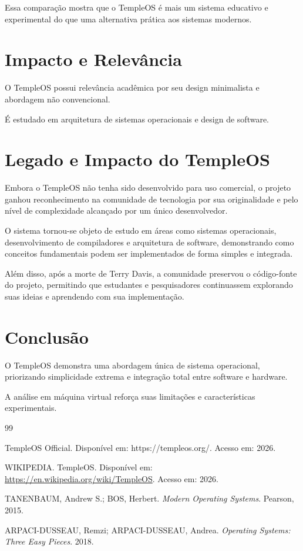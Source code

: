 \documentclass[12pt,oneside,a4paper,chapter=TITLE]{abntex2}
\begin{document}
Essa comparação mostra que o TempleOS é mais um sistema educativo e experimental do que uma alternativa prática aos sistemas modernos.

\section{Impacto e Relevância}

O TempleOS possui relevância acadêmica por seu design minimalista e abordagem não convencional.

É estudado em arquitetura de sistemas operacionais e design de software.

\section {Legado e Impacto do TempleOS}

Embora o TempleOS não tenha sido desenvolvido para uso comercial, o projeto ganhou reconhecimento na comunidade de tecnologia por sua originalidade e pelo nível de complexidade alcançado por um único desenvolvedor.

O sistema tornou-se objeto de estudo em áreas como sistemas operacionais, desenvolvimento de compiladores e arquitetura de software, demonstrando como conceitos fundamentais podem ser implementados de forma simples e integrada.

Além disso, após a morte de Terry Davis, a comunidade preservou o código-fonte do projeto, permitindo que estudantes e pesquisadores continuassem explorando suas ideias e aprendendo com sua implementação.

\section{Conclusão}

O TempleOS demonstra uma abordagem única de sistema operacional, priorizando simplicidade extrema e integração total entre software e hardware.

A análise em máquina virtual reforça suas limitações e características experimentais.
\begin{thebibliography}{99}

TempleOS Official. Disponível em: https://templeos.org/. Acesso em: 2026.

WIKIPEDIA. TempleOS. Disponível em: \url{https://en.wikipedia.org/wiki/TempleOS}. Acesso em: 2026.

TANENBAUM, Andrew S.; BOS, Herbert. \textit{Modern Operating Systems}. Pearson, 2015.

ARPACI-DUSSEAU, Remzi; ARPACI-DUSSEAU, Andrea. \textit{Operating Systems: Three Easy Pieces}. 2018.

\end{thebibliography}
\end{document}
